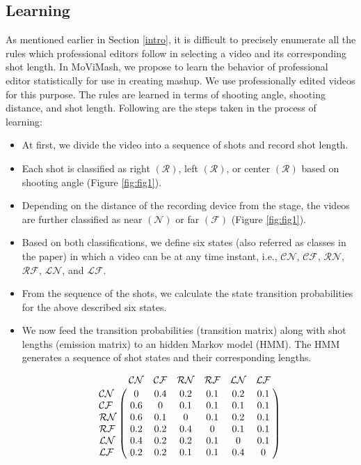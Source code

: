 \documentclass{sig-alternate}
\begin{document}
\subsection{Learning}\label{learn}
As mentioned earlier in Section \ref{intro}, it is difficult to precisely enumerate all the rules which professional editors follow in selecting a video and its corresponding shot length. In MoViMash, we propose to learn the behavior of professional editor statistically for use in creating mashup. We use professionally edited videos for this purpose. The rules are learned in terms of shooting angle, shooting distance, and shot length. Following are the steps taken in the process of learning:
 \begin{itemize} 
    \item At first, we divide the video into a sequence of shots and record shot length.
    \item Each shot is classified as right $\mathcal{(R)}$, left $\mathcal{(R)}$, or center $\mathcal{(R)}$ based on shooting angle (Figure \ref{fig:fig1}).
    \item Depending on the distance of the recording device from the stage, the videos are further classified as near $\mathcal{(N)}$ or far $\mathcal{(F)}$ (Figure \ref{fig:fig1}).
    \item Based on both classifications, we define six states (also referred as classes in the paper) in which a video can be at any time instant, i.e., $\mathcal{CN}$, $\mathcal{CF}$, $\mathcal{RN}$, $\mathcal{RF}$, $\mathcal{LN}$, and $\mathcal{LF}$.
    \item From the sequence of the shots, we calculate the state transition probabilities for the above described six states.
    \item We now feed the transition probabilities (transition matrix) along with shot lengths (emission matrix) to an hidden Markov model (HMM). The HMM generates a sequence of shot states and their corresponding lengths.

    \begin{equation}
        \bordermatrix{~ & \mathcal{CN} & \mathcal{CF} & \mathcal{RN} & \mathcal{RF} & \mathcal{LN} & \mathcal{LF} \cr
         \mathcal{CN}  &  0 & 0.4 & 0.2 & 0.1 & 0.2 & 0.1 \cr
         \mathcal{CF} & 0.6 & 0 & 0.1 & 0.1 & 0.1 & 0.1\cr
         \mathcal{RN} & 0.6 & 0.1 & 0 & 0.1 & 0.2 & 0.1\cr
         \mathcal{RF} & 0.2 & 0.2 & 0.4 & 0 & 0.1 & 0.1\cr
         \mathcal{LN} & 0.4 & 0.2 & 0.2 & 0.1 & 0 & 0.1\cr
         \mathcal{LF} & 0.2 & 0.2 & 0.1 & 0.1 & 0.4 & 0\cr
        }
    \end{equation}
 \end{itemize} 
\end{document}
